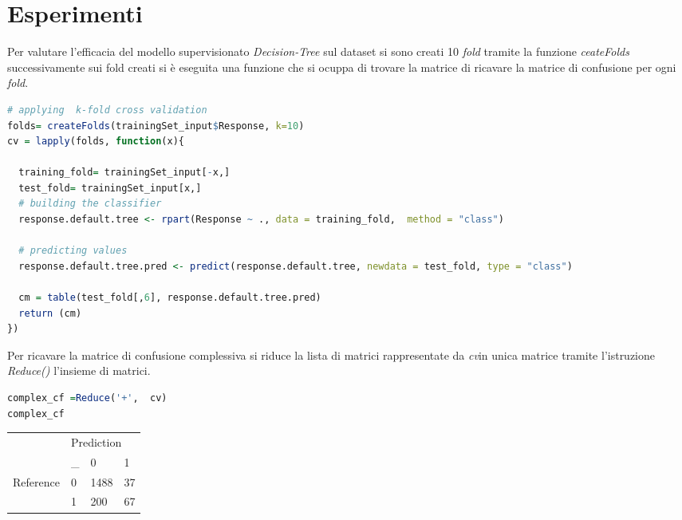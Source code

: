 \documentclass[letterpaper,11pt]{article}
\begin{document}
\section{Esperimenti}
Per valutare l'efficacia del modello supervisionato \textit{Decision-Tree} sul dataset si sono creati 10 \textit{fold} tramite la funzione \textit{ceateFolds} successivamente sui fold creati si è eseguita una funzione che si ocuppa di trovare la matrice di ricavare la matrice di confusione per ogni \textit{fold}. 


\begin{lstlisting}[language=R]
# applying  k-fold cross validation
folds= createFolds(trainingSet_input$Response, k=10)
cv = lapply(folds, function(x){
  
  training_fold= trainingSet_input[-x,]
  test_fold= trainingSet_input[x,]
  # building the classifier
  response.default.tree <- rpart(Response ~ ., data = training_fold,  method = "class")
  
  # predicting values
  response.default.tree.pred <- predict(response.default.tree, newdata = test_fold, type = "class")
 
  cm = table(test_fold[,6], response.default.tree.pred)
  return (cm)
})
\end{lstlisting}

Per ricavare la matrice di confusione complessiva si riduce la lista di matrici rappresentate da \textit{cv}in unica matrice tramite l'istruzione \textit{Reduce()} l'insieme di matrici. 

\begin{lstlisting}[language=R]
complex_cf =Reduce('+',  cv)
complex_cf
\end{lstlisting}


\begin{table}[h!]
\centering
\begin{tabular}{|ll|lll|}
\hline
\multicolumn{2}{|l|}{\multirow{2}{*}{}} & \multicolumn{3}{l|}{Prediction}                        \\ \cline{3-5} 
\multicolumn{2}{|l|}{}                  & \multicolumn{1}{c|}{\_} & \multicolumn{1}{l|}{0}  & 1  \\ \hline
\multicolumn{2}{|l|}{\multirow{2}{*}{Reference}} & \multicolumn{1}{l|}{0} & \multicolumn{1}{l|}{1488} & 37 \\ \cline{3-5} 
\multicolumn{2}{|l|}{}                  & \multicolumn{1}{l|}{1} & \multicolumn{1}{l|}{200} & 67 \\ \hline
\end{tabular}
\end{table}
\end{document}
